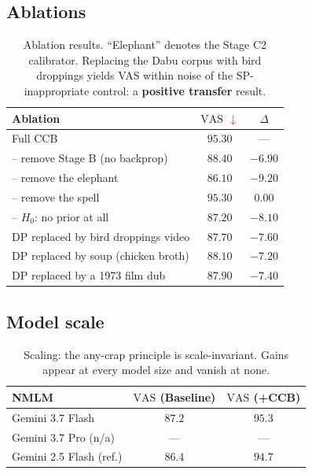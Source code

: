 \documentclass[conference,10pt]{IEEEtran}
\newcommand{\vdn}{\textcolor{red}{\ensuremath{\downarrow}}}
\newcommand{\vas}{\mathrm{VAS}}
\begin{document}
\subsection{Ablations}
\begin{table}[H]
\caption{Ablation results. ``Elephant'' denotes the Stage C2
calibrator. Replacing the Dabu corpus with bird droppings yields
VAS within noise of the SP-inappropriate control: a \textbf{positive
transfer} result.}
\label{tab:abl}
\begin{tabular}{@{}lcc@{}}
\toprule
Ablation & $\vas$ \vdn & $\Delta$\\
\midrule
Full CCB                       & $95.30$ & ---\\
\quad -- remove Stage B (no backprop) & $88.40$ & $-6.90$\\
\quad -- remove the elephant         & $86.10$ & $-9.20$\\
\quad -- remove the spell            & $95.30$ & $0.00$\\
\quad -- $H_0$: no prior at all        & $87.20$ & $-8.10$\\
\midrule
DP replaced by bird droppings video & $87.70$ & $-7.60$\\
DP replaced by soup (chicken broth) & $88.10$ & $-7.20$\\
DP replaced by a 1973 film dub     & $87.90$ & $-7.40$\\
\bottomrule
\end{tabular}
\label{tab:abl2}
\end{table}

\FloatBarrier
\subsection{Model scale}
\begin{table}[H]
\caption{Scaling: the any-crap principle is scale-invariant. Gains
appear at every model size and vanish at none.}
\label{tab:scale}
\begin{tabular}{@{}lcc@{}}
\toprule
NMLM & $\vas$ (Baseline) & $\vas$ (+CCB)\\
\midrule
Gemini 3.7 Flash                         & $87.2$ & $95.3$\\
Gemini 3.7 Pro (n/a)            & ---      & ---\\
Gemini 2.5 Flash (ref.)         & $86.4$ & $94.7$\\
\bottomrule
\end{tabular}
\end{table}
\end{document}
